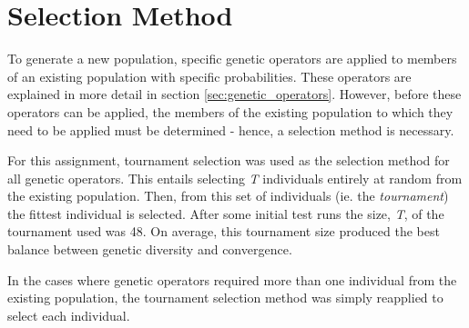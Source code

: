 \section{Selection Method}
To generate a new population, specific genetic operators are applied to members of an existing population with specific probabilities. These operators are explained in more detail in section \ref{sec:genetic_operators}. However, before these operators can be applied, the members of the existing population to which they need to be applied must be determined - hence, a selection method is necessary.

For this assignment, tournament selection \cite{miller1995genetic} was used as the selection method for all genetic operators. This entails selecting \emph{T} individuals entirely at random from the existing population. Then, from this set of individuals (ie. the \emph{tournament}) the fittest individual is selected. After some initial test runs the size, \emph{T}, of the tournament used was 48. On average, this tournament size produced the best balance between genetic diversity and convergence.

In the cases where genetic operators required more than one individual from the existing population, the tournament selection method was simply reapplied to select each individual.